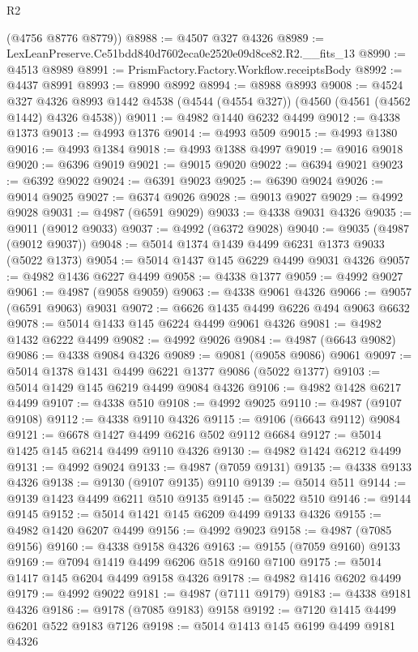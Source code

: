 \begin{lexlean}{R2}
\begin{coremodule}
      (@4756 @8776 @8779))
@8988 := @4507 @327 @4326
@8989 := LexLeanPreserve.Ce51bdd840d7602eca0e2520e09d8ce82.R2.__fits_13
@8990 := @4513 @8989
@8991 := PrismFactory.Factory.Workflow.receiptsBody
@8992 := @4437 @8991
@8993 := @8990 @8992
@8994 := @8988 @8993
@9008 := @4524
    @327
    @4326
    @8993
    @1442
    @4538
    (@4544 (@4554 @327))
    (@4560 (@4561 (@4562 @1442) @4326 @4538))
@9011 := @4982 @1440 @6232 @4499
@9012 := @4338 @1373
@9013 := @4993 @1376
@9014 := @4993 @509
@9015 := @4993 @1380
@9016 := @4993 @1384
@9018 := @4993 @1388 @4997
@9019 := @9016 @9018
@9020 := @6396 @9019
@9021 := @9015 @9020
@9022 := @6394 @9021
@9023 := @6392 @9022
@9024 := @6391 @9023
@9025 := @6390 @9024
@9026 := @9014 @9025
@9027 := @6374 @9026
@9028 := @9013 @9027
@9029 := @4992 @9028
@9031 := @4987 (@6591 @9029)
@9033 := @4338 @9031 @4326
@9035 := @9011 (@9012 @9033)
@9037 := @4992 (@6372 @9028)
@9040 := @9035 (@4987 (@9012 @9037))
@9048 := @5014 @1374 @1439 @4499 @6231 @1373 @9033 (@5022 @1373)
@9054 := @5014 @1437 @145 @6229 @4499 @9031 @4326
@9057 := @4982 @1436 @6227 @4499
@9058 := @4338 @1377
@9059 := @4992 @9027
@9061 := @4987 (@9058 @9059)
@9063 := @4338 @9061 @4326
@9066 := @9057 (@6591 @9063) @9031
@9072 := @6626 @1435 @4499 @6226 @494 @9063 @6632
@9078 := @5014 @1433 @145 @6224 @4499 @9061 @4326
@9081 := @4982 @1432 @6222 @4499
@9082 := @4992 @9026
@9084 := @4987 (@6643 @9082)
@9086 := @4338 @9084 @4326
@9089 := @9081 (@9058 @9086) @9061
@9097 := @5014 @1378 @1431 @4499 @6221 @1377 @9086 (@5022 @1377)
@9103 := @5014 @1429 @145 @6219 @4499 @9084 @4326
@9106 := @4982 @1428 @6217 @4499
@9107 := @4338 @510
@9108 := @4992 @9025
@9110 := @4987 (@9107 @9108)
@9112 := @4338 @9110 @4326
@9115 := @9106 (@6643 @9112) @9084
@9121 := @6678 @1427 @4499 @6216 @502 @9112 @6684
@9127 := @5014 @1425 @145 @6214 @4499 @9110 @4326
@9130 := @4982 @1424 @6212 @4499
@9131 := @4992 @9024
@9133 := @4987 (@7059 @9131)
@9135 := @4338 @9133 @4326
@9138 := @9130 (@9107 @9135) @9110
@9139 := @5014 @511
@9144 := @9139 @1423 @4499 @6211 @510 @9135
@9145 := @5022 @510
@9146 := @9144 @9145
@9152 := @5014 @1421 @145 @6209 @4499 @9133 @4326
@9155 := @4982 @1420 @6207 @4499
@9156 := @4992 @9023
@9158 := @4987 (@7085 @9156)
@9160 := @4338 @9158 @4326
@9163 := @9155 (@7059 @9160) @9133
@9169 := @7094 @1419 @4499 @6206 @518 @9160 @7100
@9175 := @5014 @1417 @145 @6204 @4499 @9158 @4326
@9178 := @4982 @1416 @6202 @4499
@9179 := @4992 @9022
@9181 := @4987 (@7111 @9179)
@9183 := @4338 @9181 @4326
@9186 := @9178 (@7085 @9183) @9158
@9192 := @7120 @1415 @4499 @6201 @522 @9183 @7126
@9198 := @5014 @1413 @145 @6199 @4499 @9181 @4326

\end{coremodule}
\end{lexlean}
